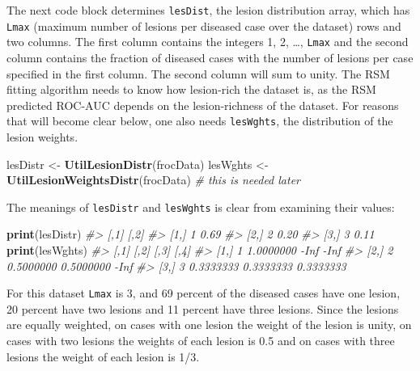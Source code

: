 \documentclass[
]{book}
\newenvironment{Shaded}{\begin{snugshade}}{\end{snugshade}}
\newcommand{\CommentTok}[1]{\textcolor[rgb]{0.56,0.35,0.01}{\textit{#1}}}
\newcommand{\KeywordTok}[1]{\textcolor[rgb]{0.13,0.29,0.53}{\textbf{#1}}}
\newcommand{\NormalTok}[1]{#1}
\newcommand{\StringTok}[1]{\textcolor[rgb]{0.31,0.60,0.02}{#1}}
\begin{document}
The next code block determines \texttt{lesDist}, the lesion distribution array, which has \texttt{Lmax} (maximum number of lesions per diseased case over the dataset) rows and two columns. The first column contains the integers 1, 2, \ldots, \texttt{Lmax} and the second column contains the fraction of diseased cases with the number of lesions per case specified in the first column. The second column will sum to unity. The RSM fitting algorithm needs to know how lesion-rich the dataset is, as the RSM predicted ROC-AUC depends on the lesion-richness of the dataset. For reasons that will become clear below, one also needs \texttt{lesWghts}, the distribution of the lesion weights.

\begin{Shaded}
\begin{Highlighting}[]
\NormalTok{lesDistr \textless{}{-}}\StringTok{ }\KeywordTok{UtilLesionDistr}\NormalTok{(frocData)}
\NormalTok{lesWghts \textless{}{-}}\StringTok{ }\KeywordTok{UtilLesionWeightsDistr}\NormalTok{(frocData) }\CommentTok{\# this is needed later}
\end{Highlighting}
\end{Shaded}

The meanings of \texttt{lesDistr} and \texttt{lesWghts} is clear from examining their values:

\begin{Shaded}
\begin{Highlighting}[]
\KeywordTok{print}\NormalTok{(lesDistr)}
\CommentTok{\#\textgreater{}      [,1] [,2]}
\CommentTok{\#\textgreater{} [1,]    1 0.69}
\CommentTok{\#\textgreater{} [2,]    2 0.20}
\CommentTok{\#\textgreater{} [3,]    3 0.11}
\KeywordTok{print}\NormalTok{(lesWghts)}
\CommentTok{\#\textgreater{}      [,1]      [,2]      [,3]      [,4]}
\CommentTok{\#\textgreater{} [1,]    1 1.0000000      {-}Inf      {-}Inf}
\CommentTok{\#\textgreater{} [2,]    2 0.5000000 0.5000000      {-}Inf}
\CommentTok{\#\textgreater{} [3,]    3 0.3333333 0.3333333 0.3333333}
\end{Highlighting}
\end{Shaded}

For this dataset \texttt{Lmax} is 3, and 69 percent of the diseased cases have one lesion, 20 percent have two lesions and 11 percent have three lesions. Since the lesions are equally weighted, on cases with one lesion the weight of the lesion is unity, on cases with two lesions the weights of each lesion is 0.5 and on cases with three lesions the weight of each lesion is 1/3.
\end{document}
